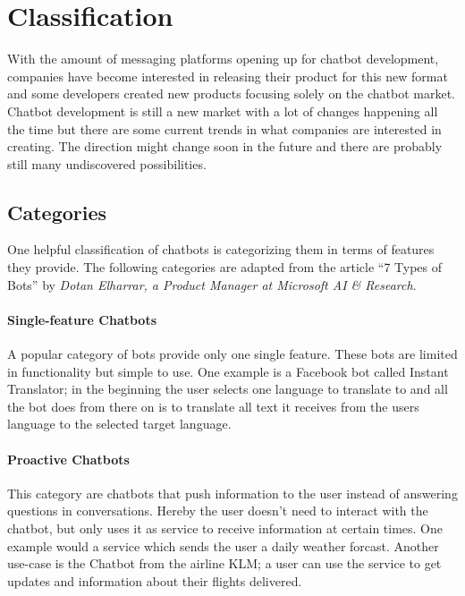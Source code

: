 \section{Classification} \label{classification}


With the amount of messaging platforms opening up for chatbot development, companies have become interested in releasing their product for this new format and some developers created new products focusing solely on the chatbot market.
\\

Chatbot development is still a new market with a lot of changes happening all the time but there are some current trends in what companies are interested in creating. The direction might change soon in the future and there are probably still many undiscovered possibilities.
\\

\subsection{Categories}

One helpful classification of chatbots is categorizing them in terms of features they provide. The following categories are adapted from the article ``7 Types of Bots'' by \emph{Dotan Elharrar, a Product Manager at Microsoft AI \& Research}\cite{bottypes}.


\paragraph{Single-feature Chatbots}

A popular category of bots provide only one single feature. These bots are limited in functionality but simple to use. One example is a Facebook bot called Instant Translator\cite{instanttranslator}; in the beginning the user selects one language to translate to and all the bot does from there on is to translate all text it receives from the users language to the selected target language.


\paragraph{Proactive Chatbots}

This category are chatbots that push information to the user instead of answering questions in conversations. Hereby the user doesn't need to interact with the chatbot, but only uses it as service to receive information at certain times. One example would a service which sends the user a daily weather forcast. Another use-case is the Chatbot from the airline KLM\cite{klm}; a user can use the service to get updates and information about their flights delivered.


